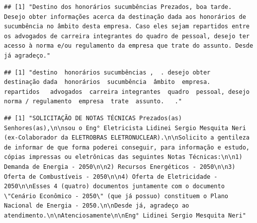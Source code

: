 \documentclass[]{article}
\newenvironment{Shaded}{\begin{snugshade}}{\end{snugshade}}
\newcommand{\CommentTok}[1]{\textcolor[rgb]{0.56,0.35,0.01}{\textit{#1}}}
\newcommand{\DecValTok}[1]{\textcolor[rgb]{0.00,0.00,0.81}{#1}}
\newcommand{\NormalTok}[1]{#1}
\newcommand{\OperatorTok}[1]{\textcolor[rgb]{0.81,0.36,0.00}{\textbf{#1}}}
\begin{document}
\begin{verbatim}
## [1] "Destino dos honorários sucumbências Prezados, boa tarde. Desejo obter informações acerca da destinação dada aos honorários de sucumbência no âmbito desta empresa. Caso eles sejam repartidos entre os advogados de carreira integrantes do quadro de pessoal, desejo ter acesso à norma e/ou regulamento da empresa que trate do assunto. Desde já agradeço."
\end{verbatim}

\begin{Shaded}
\end{Shaded}

\begin{verbatim}
## [1] "destino  honorários sucumbências ,  . desejo obter    destinação dada  honorários  sucumbência  âmbito  empresa.    repartidos   advogados  carreira integrantes  quadro  pessoal, desejo    norma / regulamento  empresa  trate  assunto.   ."
\end{verbatim}

\begin{Shaded}
\end{Shaded}

\begin{verbatim}
## [1] "SOLICITAÇÃO DE NOTAS TÉCNICAS Prezados(as) Senhores(as),\n\nsou o Eng° Eletricista Lidinei Sergio Mesquita Neri (ex-Colaborador da ELETROBRAS ELETRONUCLEAR).\n\nSolicito a gentileza de informar de que forma poderei conseguir, para informação e estudo, cópias impressas ou eletrônicas das seguintes Notas Técnicas:\n\n1) Demanda de Energia - 2050\n\n2) Recursos Energéticos - 2050\n\n3) Oferta de Combustíveis - 2050\n\n4) Oferta de Eletricidade - 2050\n\nEsses 4 (quatro) documentos juntamente com o documento \"Cenário Econômico - 2050\" (que já possuo) constituem o Plano Nacional de Energia - 2050.\n\nDesde já, agradeço ao atendimento.\n\nAtenciosamente\n\nEng° Lidinei Sergio Mesquita Neri"
\end{verbatim}

\begin{Shaded}
\end{Shaded}
\end{document}
